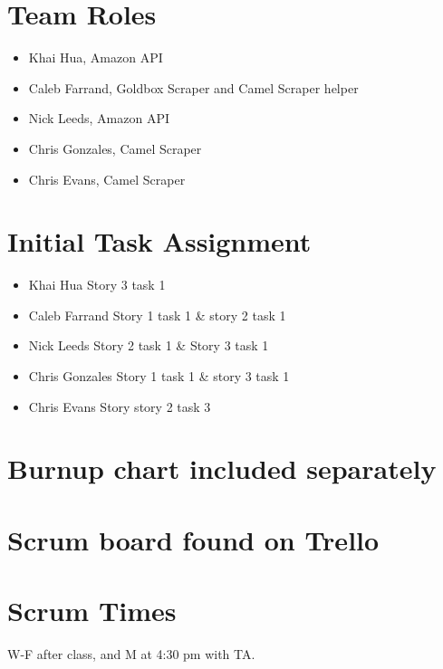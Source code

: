 \documentclass[11pt]{article}
\begin{document}
	\section{Team Roles}
		\vspace{-3mm}
		\begin{itemize}
		    \item Khai Hua, Amazon API
		    \item Caleb Farrand, Goldbox Scraper and Camel Scraper helper
		    \item Nick Leeds, Amazon API
		    \item Chris Gonzales, Camel Scraper
		    \item Chris Evans, Camel Scraper
		\end{itemize}
	\section{Initial Task Assignment}
	    \vspace{-3mm}
	    \begin{itemize}
		    \item Khai Hua Story 3 task 1
		    \item Caleb Farrand Story 1 task 1 \& story 2 task 1
		    \item Nick Leeds Story 2 task 1 \& Story 3 task 1
		    \item Chris Gonzales Story 1 task 1 \& story 3 task 1
		    \item Chris Evans Story story 2 task 3
		\end{itemize}
	\section{Burnup chart included separately}
	\section{Scrum board found on Trello}
	\section{Scrum Times}
	    W-F after class, and M at 4:30 pm with TA.
\end{document}
